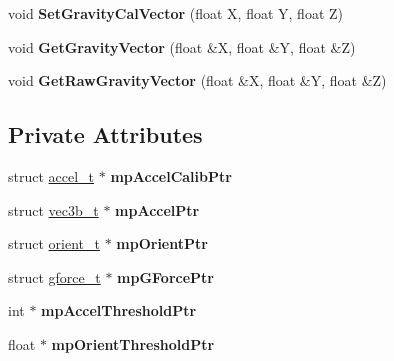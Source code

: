 \begin{DoxyCompactItemize}
\item 
\hypertarget{class_c_accelerometer_afa6961a116ebc581da421b17b3976e92}{void {\bfseries Set\-Gravity\-Cal\-Vector} (float X, float Y, float Z)}\label{class_c_accelerometer_afa6961a116ebc581da421b17b3976e92}

\item 
\hypertarget{class_c_accelerometer_ad2b57ead77ae9d6abe9d28b070e0f891}{void {\bfseries Get\-Gravity\-Vector} (float \&X, float \&Y, float \&Z)}\label{class_c_accelerometer_ad2b57ead77ae9d6abe9d28b070e0f891}

\item 
\hypertarget{class_c_accelerometer_af318f42e0e26b5122eb3a1d82919baa4}{void {\bfseries Get\-Raw\-Gravity\-Vector} (float \&X, float \&Y, float \&Z)}\label{class_c_accelerometer_af318f42e0e26b5122eb3a1d82919baa4}

\end{DoxyCompactItemize}
\subsection*{Private Attributes}
\begin{DoxyCompactItemize}
\item 
\hypertarget{class_c_accelerometer_a121c813be993f72ad2563fd27f3857a7}{struct \hyperlink{structaccel__t}{accel\-\_\-t} $\ast$ {\bfseries mp\-Accel\-Calib\-Ptr}}\label{class_c_accelerometer_a121c813be993f72ad2563fd27f3857a7}

\item 
\hypertarget{class_c_accelerometer_a9d98ce13ae72eea33a80548a384de565}{struct \hyperlink{structvec3b__t}{vec3b\-\_\-t} $\ast$ {\bfseries mp\-Accel\-Ptr}}\label{class_c_accelerometer_a9d98ce13ae72eea33a80548a384de565}

\item 
\hypertarget{class_c_accelerometer_a9d3e8f3e481f9d1f12e52de03b4dba52}{struct \hyperlink{structorient__t}{orient\-\_\-t} $\ast$ {\bfseries mp\-Orient\-Ptr}}\label{class_c_accelerometer_a9d3e8f3e481f9d1f12e52de03b4dba52}

\item 
\hypertarget{class_c_accelerometer_adeb9c7760b24329e98f6991b934c7237}{struct \hyperlink{structgforce__t}{gforce\-\_\-t} $\ast$ {\bfseries mp\-G\-Force\-Ptr}}\label{class_c_accelerometer_adeb9c7760b24329e98f6991b934c7237}

\item 
\hypertarget{class_c_accelerometer_abc3dac2cc1659a873d328d8f50cd3985}{int $\ast$ {\bfseries mp\-Accel\-Threshold\-Ptr}}\label{class_c_accelerometer_abc3dac2cc1659a873d328d8f50cd3985}

\item 
\hypertarget{class_c_accelerometer_a10e1ee61f93ece8b81f231ddf4898c23}{float $\ast$ {\bfseries mp\-Orient\-Threshold\-Ptr}}\label{class_c_accelerometer_a10e1ee61f93ece8b81f231ddf4898c23}

\end{DoxyCompactItemize}


